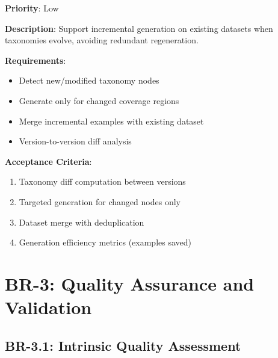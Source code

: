 \begin{tcolorbox}[colback=green!5,colframe=green!70,title=BR-2.5: Incremental Generation Support]
\textbf{Priority}: Low

\textbf{Description}: Support incremental generation on existing datasets when
taxonomies evolve, avoiding redundant regeneration.

\textbf{Requirements}:
\begin{itemize}
  \item Detect new/modified taxonomy nodes
  \item Generate only for changed coverage regions
  \item Merge incremental examples with existing dataset
  \item Version-to-version diff analysis
\end{itemize}

\textbf{Acceptance Criteria}:
\begin{enumerate}
  \item Taxonomy diff computation between versions
  \item Targeted generation for changed nodes only
  \item Dataset merge with deduplication
  \item Generation efficiency metrics (examples saved)
\end{enumerate}
\end{tcolorbox}


\section{BR-3: Quality Assurance and Validation}

\subsection{BR-3.1: Intrinsic Quality Assessment}

